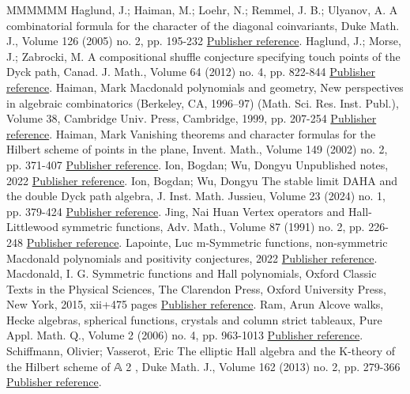 \documentclass[11pt]{article}
\theoremstyle{definition}
\numberwithin{equation}{section}
\begin{document}
\begin{thebibliography}{MMMMMM}
 Haglund, J.; Haiman, M.; Loehr, N.; Remmel, J. B.; Ulyanov, A. A combinatorial formula for the character of the diagonal coinvariants, Duke Math. J., Volume 126 (2005) no. 2, pp. 195-232 \href{https://alco.centre-mersenne.org/articles/10.5802/alco.395/#HHLRU-2003}{Publisher reference}.
 Haglund, J.; Morse, J.; Zabrocki, M. A compositional shuffle conjecture specifying touch points of the Dyck path, Canad. J. Math., Volume 64 (2012) no. 4, pp. 822-844 \href{https://alco.centre-mersenne.org/articles/10.5802/alco.395/#HMZ}{Publisher reference}.
 Haiman, Mark Macdonald polynomials and geometry, New perspectives in algebraic combinatorics (Berkeley, CA, 1996–97) (Math. Sci. Res. Inst. Publ.), Volume 38, Cambridge Univ. Press, Cambridge, 1999, pp. 207-254 \href{https://alco.centre-mersenne.org/articles/10.5802/alco.395/#HMacDG}{Publisher reference}.
 Haiman, Mark Vanishing theorems and character formulas for the Hilbert scheme of points in the plane, Invent. Math., Volume 149 (2002) no. 2, pp. 371-407 \href{https://alco.centre-mersenne.org/articles/10.5802/alco.395/#HVanish}{Publisher reference}.
 Ion, Bogdan; Wu, Dongyu Unpublished notes, 2022 \href{https://alco.centre-mersenne.org/articles/10.5802/alco.395/#IW_2022}{Publisher reference}.
 Ion, Bogdan; Wu, Dongyu The stable limit DAHA and the double Dyck path algebra, J. Inst. Math. Jussieu, Volume 23 (2024) no. 1, pp. 379-424 \href{https://alco.centre-mersenne.org/articles/10.5802/alco.395/#Ion_2022}{Publisher reference}.
 Jing, Nai Huan Vertex operators and Hall-Littlewood symmetric functions, Adv. Math., Volume 87 (1991) no. 2, pp. 226-248 \href{https://alco.centre-mersenne.org/articles/10.5802/alco.395/#Jing_91}{Publisher reference}.
 Lapointe, Luc m-Symmetric functions, non-symmetric Macdonald polynomials and positivity conjectures, 2022 \href{https://alco.centre-mersenne.org/articles/10.5802/alco.395/#lapointe2022msymmetric}{Publisher reference}.
 Macdonald, I. G. Symmetric functions and Hall polynomials, Oxford Classic Texts in the Physical Sciences, The Clarendon Press, Oxford University Press, New York, 2015, xii+475 pages \href{https://alco.centre-mersenne.org/articles/10.5802/alco.395/#Macdonald}{Publisher reference}.
 Ram, Arun Alcove walks, Hecke algebras, spherical functions, crystals and column strict tableaux, Pure Appl. Math. Q., Volume 2 (2006) no. 4, pp. 963-1013 \href{https://alco.centre-mersenne.org/articles/10.5802/alco.395/#ram2006alcove}{Publisher reference}.
 Schiffmann, Olivier; Vasserot, Eric The elliptic Hall algebra and the K-theory of the Hilbert scheme of 𝔸 2 , Duke Math. J., Volume 162 (2013) no. 2, pp. 279-366 \href{https://alco.centre-mersenne.org/articles/10.5802/alco.395/#SV}{Publisher reference}.
\end{thebibliography}
\end{document}
